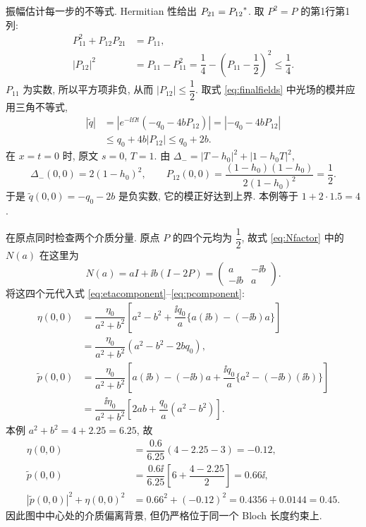 \par\smallskip\noindent 振幅估计每一步的不等式.\quad
Hermitian 性给出 $P_{21}={P_{12}}^{*}$. 取 $P^2=P$ 的第1行第1列:
\begin{align*}
P_{11}^2+P_{12}P_{21}&=P_{11},\\
|P_{12}|^2&=P_{11}-P_{11}^2
=\dfrac{1}{4}-\left(P_{11}-\dfrac{1}{2}\right)^2\le\dfrac{1}{4}.
\end{align*}
$P_{11}$ 为实数, 所以平方项非负, 从而 $|P_{12}|\le\dfrac{1}{2}$. 取式 \eqref{eq:finalfields} 中光场的模并应用三角不等式,
\begin{align*}
|\widetilde q|
&=\left|e^{-\ii\Omega t}(-q_0-4bP_{12})\right|
=|-q_0-4bP_{12}|\\
&\le q_0+4b|P_{12}|
\le q_0+2b.
\end{align*}
在 $x=t=0$ 时, 原文 $s=0$, $T=1$. 由 $\Delta_-=|T-h_0|^2+|1-h_0T|^2$,
\begin{equation*}
\Delta_-(0,0)=2(1-h_0)^2,
\qquad
P_{12}(0,0)=\dfrac{(1-h_0)(1-h_0)}{2(1-h_0)^2}=\dfrac{1}{2}.
\end{equation*}
于是 $\widetilde q(0,0)=-q_0-2b$ 是负实数, 它的模正好达到上界. 本例等于 $1+2\cdot1.5=4$.

\par\smallskip\noindent 在原点同时检查两个介质分量.\quad
原点 $P$ 的四个元均为 $\dfrac{1}{2}$, 故式 \eqref{eq:Nfactor} 中的 $N(a)$ 在这里为
\begin{equation*}
N(a)=aI+\ii b(I-2P)
=\begin{pmatrix}a&-\ii b\\-\ii b&a\end{pmatrix}.
\end{equation*}
将这四个元代入式 \eqref{eq:etacomponent}--\eqref{eq:pcomponent}:
\begin{align*}
\eta(0,0)
&=\dfrac{\eta_0}{a^2+b^2}
\left[a^2-b^2+\dfrac{\ii q_0}{a}
\{a(\ii b)-(-\ii b)a\}\right]\\
&=\dfrac{\eta_0}{a^2+b^2}(a^2-b^2-2bq_0),\\
\widetilde p(0,0)
&=\dfrac{\eta_0}{a^2+b^2}
\left[a(\ii b)-(-\ii b)a
+\dfrac{\ii q_0}{a}\{a^2-(-\ii b)(\ii b)\}\right]\\
&=\dfrac{\ii\eta_0}{a^2+b^2}
\left[2ab+\dfrac{q_0}{a}(a^2-b^2)\right].
\end{align*}
本例 $a^2+b^2=4+2.25=6.25$, 故
\begin{align*}
\eta(0,0)&=\dfrac{0.6}{6.25}(4-2.25-3)=-0.12,\\
\widetilde p(0,0)&=\dfrac{0.6\ii}{6.25}
\left[6+\dfrac{4-2.25}{2}\right]=0.66\ii,\\
|\widetilde p(0,0)|^2+\eta(0,0)^2
&=0.66^2+(-0.12)^2=0.4356+0.0144=0.45.
\end{align*}
因此图中中心处的介质偏离背景, 但仍严格位于同一个 Bloch 长度约束上.

